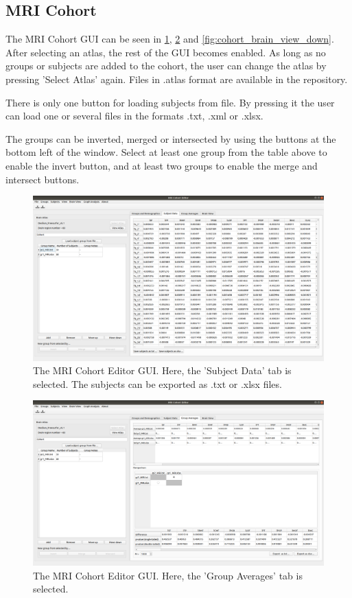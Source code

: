 \documentclass{article}
\begin{document}
\subsection{MRI Cohort}

The MRI Cohort GUI can be seen in \cref{fig:mri_cohort_subject}, \cref{fig:mri_cohort_group} and \cref{fig:cohort_brain_view_down}. After selecting an atlas, the rest of the GUI becomes enabled. As long as no groups or subjects are added to the cohort, the user can change the atlas by pressing 'Select Atlas' again. Files in .atlas format are available in the repository.

There is only one button for loading subjects from file. By pressing it the user can load one or several files in the formats .txt, .xml or .xlsx.

The groups can be inverted, merged or intersected by using the buttons at the bottom left of the window. Select at least one group from the table above to enable the invert button, and at least two groups to enable the merge and intersect buttons. 

\begin{figure}[H]
    \centering
    \includegraphics[width=0.9\linewidth]{mri_cohort_subject.png}
    \caption{The MRI Cohort Editor GUI. Here, the 'Subject Data' tab is selected. The subjects can be exported as .txt or .xlsx files.}
    \label{fig:mri_cohort_subject}
\end{figure}

\begin{figure}[H]
    \centering
    \includegraphics[width=0.9\linewidth]{mri_cohort_group.png}
    \caption{The MRI Cohort Editor GUI. Here, the 'Group Averages' tab is selected.}
    \label{fig:mri_cohort_group}
\end{figure}
\end{document}
